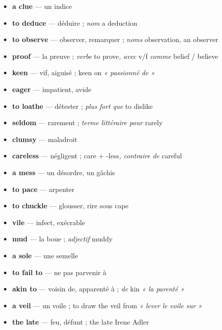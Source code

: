 \documentclass{fiche}
\begin{document}

\begin{itemize}[label=--,itemsep=0.8mm,leftmargin=*]\small
  \item \textbf{a clue} — un indice
  \item \textbf{to deduce} — déduire ; \textit{nom} a deduction
  \item \textbf{to observe} — observer, remarquer ; \textit{noms} observation, an observer
  \item \textbf{proof} — la preuve ; \textit{verbe} to prove\textit{, avec} v/f \textit{comme} belief / believe
  \item \textbf{keen} — vif, aiguisé ; keen on \textit{« passionné de »}
  \item \textbf{eager} — impatient, avide
  \item \textbf{to loathe} — détester ; \textit{plus fort que} to dislike
  \item \textbf{seldom} — rarement ; \textit{terme littéraire pour} rarely
  \item \textbf{clumsy} — maladroit
  \item \textbf{careless} — négligent ; care + -less\textit{, contraire de} careful
  \item \textbf{a mess} — un désordre, un gâchis
  \item \textbf{to pace} — arpenter
  \item \textbf{to chuckle} — glousser, rire sous cape
  \item \textbf{vile} — infect, exécrable
  \item \textbf{mud} — la boue ; \textit{adjectif} muddy
  \item \textbf{a sole} — une semelle
  \item \textbf{to fail to} — ne pas parvenir à
  \item \textbf{akin to} — voisin de, apparenté à ; \textit{de} kin \textit{« la parenté »}
  \item \textbf{a veil} — un voile ; to draw the veil from \textit{« lever le voile sur »}
  \item \textbf{the late} — feu, défunt ; the late Irene Adler
\end{itemize}
\end{document}
